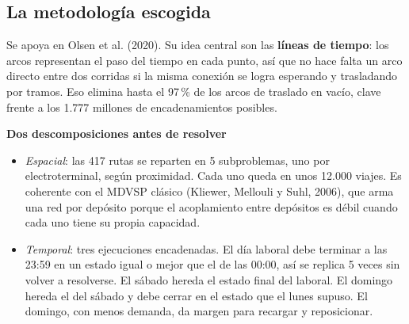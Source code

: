 \documentclass[11pt,a4paper,parskip=half]{scrartcl}
\begin{document}
\subsection{La metodología escogida}
Se apoya en Olsen et al. (2020). Su idea central son las \textbf{líneas de tiempo}: los arcos representan el paso del tiempo en cada punto, así que no hace falta un arco directo entre dos corridas si la misma conexión se logra esperando y trasladando por tramos. Eso elimina hasta el 97\,\% de los arcos de traslado en vacío, clave frente a los 1.777 millones de encadenamientos posibles.

\textbf{Dos descomposiciones antes de resolver}
\begin{itemize}
  \item \emph{Espacial}: las 417 rutas se reparten en 5 subproblemas, uno por electroterminal, según proximidad. Cada uno queda en unos 12.000 viajes. Es coherente con el MDVSP clásico (Kliewer, Mellouli y Suhl, 2006), que arma una red por depósito porque el acoplamiento entre depósitos es débil cuando cada uno tiene su propia capacidad.
  \item \emph{Temporal}: tres ejecuciones encadenadas. El día laboral debe terminar a las 23:59 en un estado igual o mejor que el de las 00:00, así se replica 5 veces sin volver a resolverse. El sábado hereda el estado final del laboral. El domingo hereda el del sábado y debe cerrar en el estado que el lunes supuso. El domingo, con menos demanda, da margen para recargar y reposicionar.
\end{itemize}
\end{document}
